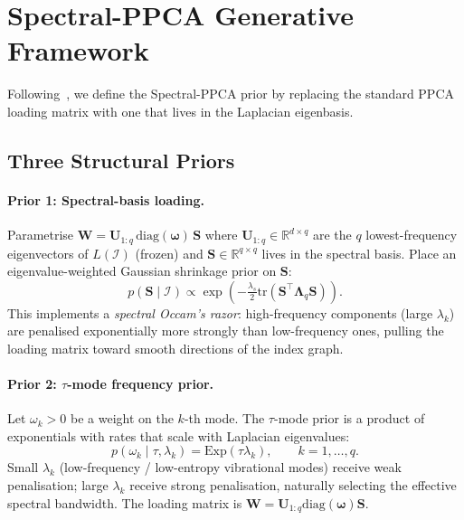 \documentclass[11pt,a4paper]{article}
\newcommand{\R}{\mathbb{R}}
\newcommand{\I}{\mathcal{I}}
\newcommand{\diag}{\mathrm{diag}}
\newcommand{\tr}{\mathrm{tr}}
\newcommand{\bLambda}{\bm{\Lambda}}
\newcommand{\bU}{\bm{U}}
\newcommand{\bS}{\bm{S}}
\newcommand{\bW}{\bm{W}}
\newcommand{\bomega}{\bm{\omega}}
\begin{document}
\section{Spectral-PPCA Generative Framework}
\label{sec:spectral_ppca}

Following~\citet{design_a}, we define the Spectral-PPCA prior by replacing the
standard PPCA loading matrix with one that lives in the Laplacian eigenbasis.

\subsection{Three Structural Priors}

\paragraph{Prior 1: Spectral-basis loading.}
Parametrise $\bW = \bU_{1:q}\,\diag(\bomega)\,\bS$ where
$\bU_{1:q}\in\R^{d\times q}$ are the $q$ lowest-frequency eigenvectors of
$L(\I)$ (frozen) and $\bS\in\R^{q\times q}$ lives in the spectral basis.
Place an eigenvalue-weighted Gaussian shrinkage prior on $\bS$:
\begin{equation}
  p(\bS\mid\I) \propto
  \exp\!\left(-\tfrac{\lambda_s}{2}\tr(\bS^\top \bLambda_q \bS)\right).
  \label{eq:prior_S}
\end{equation}
This implements a \emph{spectral Occam's razor}: high-frequency components
(large $\lambda_k$) are penalised exponentially more strongly than
low-frequency ones, pulling the loading matrix toward smooth directions of the
index graph.

\paragraph{Prior 2: $\tau$-mode frequency prior.}
Let $\omega_k > 0$ be a weight on the $k$-th mode.  The $\tau$-mode prior is a
product of exponentials with rates that scale with Laplacian eigenvalues:
\begin{equation}
  p(\omega_k\mid\tau,\lambda_k) = \mathrm{Exp}(\tau\lambda_k),
  \qquad k=1,\dots,q.
  \label{eq:prior_omega}
\end{equation}
Small $\lambda_k$ (low-frequency / low-entropy vibrational modes) receive weak
penalisation; large $\lambda_k$ receive strong penalisation, naturally
selecting the effective spectral bandwidth.  The loading matrix is
$\bW = \bU_{1:q}\diag(\bomega)\bS$.
\end{document}

